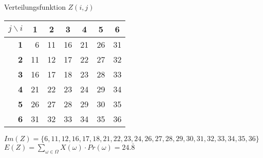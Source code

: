 \documentclass[a4paper]{scrartcl}
\begin{document}
\begin{flushleft}
		\begin{center}
		Verteilungsfunktion $Z(i,j)$\\
		\begin{tabular}{|r|r|r|r|r|r|r|}
		\hline
		\multicolumn{1}{|c|}{$j\backslash i$} & \multicolumn{1}{c|}{\textbf{1}} & \multicolumn{1}{c|}{\textbf{2}} & \multicolumn{1}{c|}{\textbf{3}} & \multicolumn{1}{c|}{\textbf{4}} & \multicolumn{1}{c|}{\textbf{5}} & \multicolumn{1}{c|}{\textbf{6}} \\ \hline
		\textbf{1} & 6   & 11 & 16 & 21 & 26 & 31 \\ \hline
		\textbf{2} & 11  & 12 & 17 & 22 & 27 & 32 \\ \hline
		\textbf{3} & 16  & 17 & 18 & 23 & 28 & 33 \\ \hline
		\textbf{4} & 21  & 22 & 23 & 24 & 29 & 34 \\ \hline
		\textbf{5} & 26  & 27 & 28 & 29 & 30 & 35 \\ \hline
		\textbf{6} & 31  & 32 & 33 & 34 & 35 & 36 \\ \hline
		\end{tabular}
		\end{center}
		$Im(Z)=\{6,11,12,16,17,18,21,22,23,24,26,27,28,29,30,31,32,33,34,35,36\}$\\
		$E(Z)=\sum\limits_{\omega\in\Omega} X(\omega)\cdot Pr(\omega) = 24.\overline{8}$\\[1em]
		
	\end{flushleft}
\end{document}
